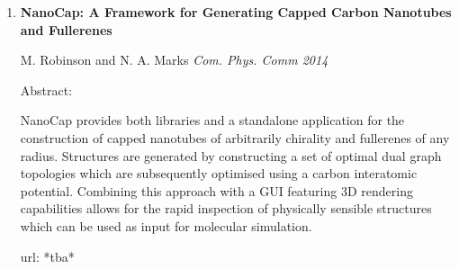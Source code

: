 \begin{enumerate}
\item \textbf{NanoCap: A Framework for Generating Capped Carbon Nanotubes and Fullerenes}

M. Robinson and N. A. Marks \textit{Com. Phys. Comm 2014}

Abstract:

NanoCap provides both libraries and a standalone application for the construction of capped nanotubes of arbitrarily chirality and fullerenes of any radius. 
Structures are generated by constructing a set of optimal dual graph topologies which are subsequently optimised using a carbon interatomic potential. 
Combining this approach with a GUI featuring 3D rendering capabilities allows for the rapid inspection of physically sensible structures which can be used as input for molecular simulation.

url: *tba*

\end{enumerate}

%

